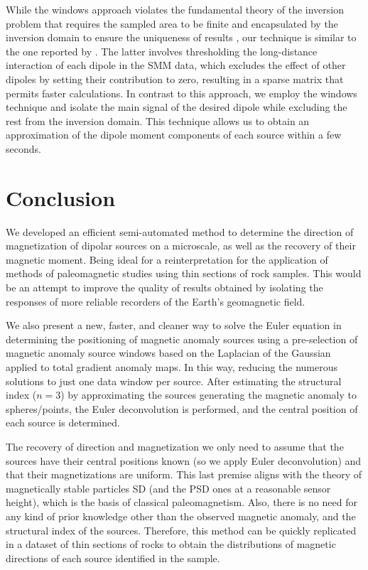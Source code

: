 While the windows approach violates the fundamental theory of the inversion problem that requires the sampled area to be finite and encapsulated by the inversion domain to ensure the uniqueness of results \citep{Baratchart2013,Lima2013}, our technique is similar to the one reported by \cite{Weiss2007}. The latter involves thresholding the long-distance interaction of each dipole in the SMM data, which excludes the effect of other dipoles by setting their contribution to zero, resulting in a sparse matrix that permits faster calculations. In contrast to this approach, we employ the windows technique and isolate the main signal of the desired dipole while excluding the rest from the inversion domain. This technique allows us to obtain an approximation of the dipole moment components of each source within a few seconds.


\section{Conclusion}

We developed an efficient semi-automated method to determine the direction of
magnetization of dipolar sources on a microscale, as well as the recovery of
their magnetic moment. Being ideal for a reinterpretation for the application
of methods of paleomagnetic studies using thin sections of rock samples. This
would be an attempt to improve the quality of results obtained by isolating the
responses of more reliable recorders of the Earth's geomagnetic field.

We also present a new, faster, and cleaner way to solve the Euler equation in
determining the positioning of magnetic anomaly sources using a pre-selection
of magnetic anomaly source windows based on the Laplacian of the Gaussian
applied to total gradient anomaly maps. In this way, reducing the numerous
solutions to just one data window per source. After estimating the structural
index ($n = 3$) by approximating the sources generating the magnetic anomaly to
spheres/points, the Euler deconvolution is performed, and the central position
of each source is determined.

The recovery of direction and magnetization we only need to assume that the
sources have their central positions known (so we apply Euler deconvolution)
and that their magnetizations are uniform. This last premise aligns with the
theory of magnetically stable particles SD (and the PSD ones at a reasonable
sensor height), which is the basis of classical paleomagnetism. Also, there is
no need for any kind of prior knowledge other than the observed magnetic
anomaly, and the structural index of the sources. Therefore, this method can be
quickly replicated in a dataset of thin sections of rocks to obtain the
distributions of magnetic directions of each source identified in the sample.

